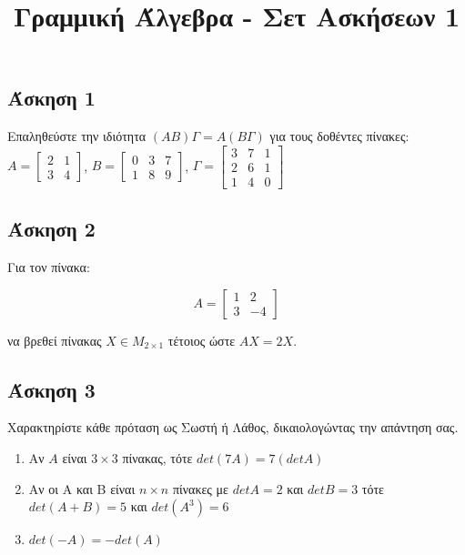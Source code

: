 \documentclass{article}
\title{Γραμμική Άλγεβρα - Σετ Ασκήσεων 1}
\date{}
\begin{document}
\maketitle



\subsection*{Άσκηση 1}

Eπαληθεύστε την ιδιότητα \((AB)\Gamma = A(B\Gamma)\) για τους δοθέντες πίνακες: \\

\( A = \begin{bmatrix} 2 & 1 \\ 3 & 4 \end{bmatrix} \),
\( B = \begin{bmatrix} 0 & 3 & 7 \\ 1 & 8 & 9 \end{bmatrix} \),
\( \Gamma = \begin{bmatrix} 3 & 7 & 1 \\ 2 & 6 & 1 \\ 1 & 4 & 0 \end{bmatrix} \)

\subsection*{Άσκηση 2}
Για τον πίνακα:

\[
A = \begin{bmatrix} 1 & 2 \\ 3 & -4 \end{bmatrix}
\]

να βρεθεί πίνακας $X \in M_{2\times1}$ τέτοιος ώστε $ΑX=2X$.

\subsection*{Άσκηση 3}
Χαρακτηρίστε κάθε πρόταση ως Σωστή ή Λάθος, δικαιολογώντας την απάντηση σας.
\begin{enumerate}
\item Αν $Α$ είναι $3\times3$ πίνακας, τότε $det(7A)=7(detA)$
\item Αν οι Α και Β είναι $n\times n$ πίνακες με $detA=2$ και $detB=3$ τότε $det(A+B)=5$ και $det(A^3)=6$
\item $det(-A)=-det(A)$
\end{enumerate}
\end{document}
